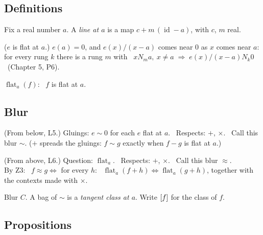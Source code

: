 \subsection*{Definitions}

\begin{lines}
\item[\lab{D1}] Fix a real number $a$. A \emph{line at $a$} is a map $c + m\,(\operatorname{id} - a)$, with $c$, $m$ real.
\item[\lab{D2}] ($e$ is flat at $a$.) $e(a) = 0$, and $e(x)/(x - a)$ comes near $0$ as $x$ comes near $a$: for every rung $k$ there is a rung $m$ with \ $x \mathrel{N_m} a,\ x \neq a \;\Rightarrow\; e(x)/(x - a) \mathrel{N_k} 0$ \ (Chapter 5, P6).
\item[\lab{D3}] $\operatorname{flat}_a(f)$: \ $f$ is flat at $a$.
\end{lines}

\subsection*{Blur}

\begin{lines}
\item[\lab{B1}] (From below, L5.) Gluings: $e \sim 0$ for each $e$ flat at $a$. \ Respects: $+$, $\times$. \ Call this blur $\sim$. ($+$ spreads the gluings: $f \sim g$ exactly when $f - g$ is flat at $a$.)
\item[\lab{B2}] (From above, L6.) Question: $\operatorname{flat}_a$. \ Respects: $+$, $\times$. \ Call this blur $\approx$. \\
By Z3: \ $f \approx g \iff$ for every $h$: \ $\operatorname{flat}_a(f + h) \Leftrightarrow \operatorname{flat}_a(g + h)$, together with the contexts made with $\times$.
\item[] Blur $C$. A bag of $\sim$ is a \emph{tangent class at $a$}. Write $[f]$ for the class of $f$.
\end{lines}

\subsection*{Propositions}

